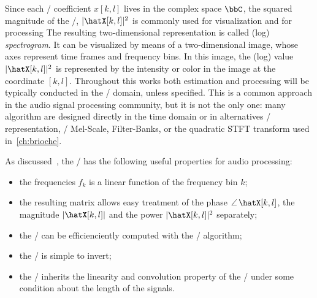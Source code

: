 Since each \STFT/ coefficient $x[k, l]$ lives in the complex space $\bbC$, the squared magnitude of the \STFT/, $\powerOf{\hatX[k,l]}$ is
commonly used for visualization and for processing
The resulting two-dimensional representation is called (log) \textit{spectrogram}.
It can be visualized by means of a two-dimensional image, whose axes represent time frames and frequency bins.
In this image, the (log) value $\powerOf{\hatX[k,l]}$ is represented by the intensity or color in the image at the coordinate $[k,l]$.
Throughout this works both estimation and processing will be typically conducted in the \STFT/ domain, unless specified.
This is a common approach in the audio signal processing community, but it is not the only one:
many algorithm are designed directly in the time domain or in alternatives \TF/ representation, \eg/ Mel-Scale, Filter-Banks, or the quadratic STFT transform used in~\cref{ch:brioche}.

As discussed~, the \STFT/ has the following useful properties for audio processing:
\begin{itemize}
    \item the frequencies $f_k$ is a linear function of the frequency bin $k$;
    \item the resulting matrix allows easy treatment of the phase $\phaseOf{\hatX[k,l]}$, the magnitude $\magnitudeOf{\hatX[k,l]}$ and the power $\powerOf{\hatX[k,l]}$ separately;
    \item the \DFT/ can be efficienciently computed with the \FFT/ algorithm;
    \item the \STFT/ is simple to invert;
    \item the \STFT/ inherits the linearity and convolution property of the \DFT/ under some condition about the length of the signals.
\end{itemize}

